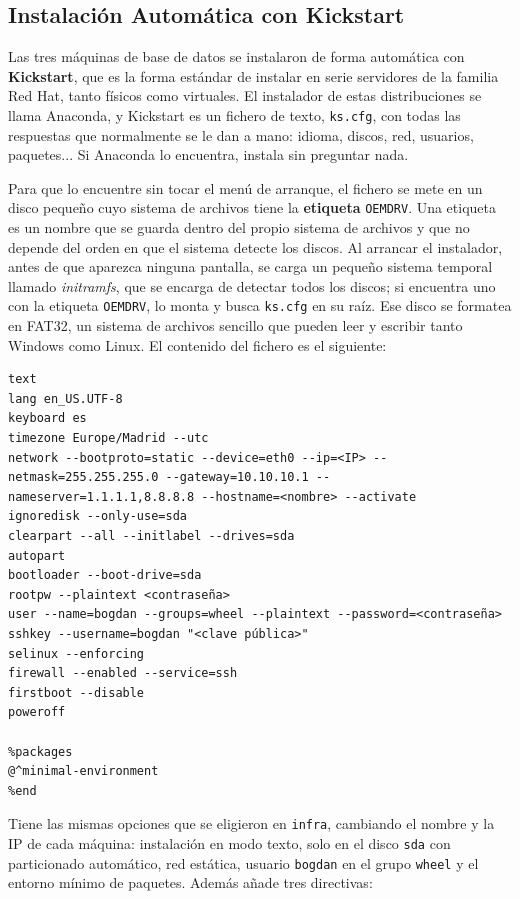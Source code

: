 \documentclass[11pt, a4paper, titlepage]{article}
\newcommand{\cod}[1]{\texttt{#1}}
\begin{document}
\subsection{Instalación Automática con Kickstart}

Las tres máquinas de base de datos se instalaron de forma automática con \textbf{Kickstart}, que es la forma estándar de instalar en serie servidores de la familia Red Hat, tanto físicos como virtuales. El instalador de estas distribuciones se llama Anaconda, y Kickstart es un fichero de texto, \cod{ks.cfg}, con todas las respuestas que normalmente se le dan a mano: idioma, discos, red, usuarios, paquetes... Si Anaconda lo encuentra, instala sin preguntar nada.

Para que lo encuentre sin tocar el menú de arranque, el fichero se mete en un disco pequeño cuyo sistema de archivos tiene la \textbf{etiqueta} \cod{OEMDRV}. Una etiqueta es un nombre que se guarda dentro del propio sistema de archivos y que no depende del orden en que el sistema detecte los discos. Al arrancar el instalador, antes de que aparezca ninguna pantalla, se carga un pequeño sistema temporal llamado \textit{initramfs}, que se encarga de detectar todos los discos; si encuentra uno con la etiqueta \cod{OEMDRV}, lo monta y busca \cod{ks.cfg} en su raíz. Ese disco se formatea en FAT32, un sistema de archivos sencillo que pueden leer y escribir tanto Windows como Linux. El contenido del fichero es el siguiente:

\begin{lstlisting}[style=salida, caption={Plantilla del fichero Kickstart que genera el script.}]
text
lang en_US.UTF-8
keyboard es
timezone Europe/Madrid --utc
network --bootproto=static --device=eth0 --ip=<IP> --netmask=255.255.255.0 --gateway=10.10.10.1 --nameserver=1.1.1.1,8.8.8.8 --hostname=<nombre> --activate
ignoredisk --only-use=sda
clearpart --all --initlabel --drives=sda
autopart
bootloader --boot-drive=sda
rootpw --plaintext <contraseña>
user --name=bogdan --groups=wheel --plaintext --password=<contraseña>
sshkey --username=bogdan "<clave pública>"
selinux --enforcing
firewall --enabled --service=ssh
firstboot --disable
poweroff

%packages
@^minimal-environment
%end
\end{lstlisting}

Tiene las mismas opciones que se eligieron en \cod{infra}, cambiando el nombre y la IP de cada máquina: instalación en modo texto, solo en el disco \cod{sda} con particionado automático, red estática, usuario \cod{bogdan} en el grupo \cod{wheel} y el entorno mínimo de paquetes. Además añade tres directivas:
\end{document}
